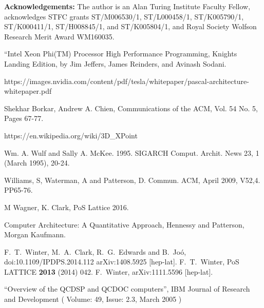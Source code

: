 \documentclass{PoS}
\begin{document}
{\bf Acknowledgements:} The author is an Alan Turing Institute Faculty Fellow, acknowledges 
STFC grants ST/M006530/1, ST/L000458/1, ST/K005790/1, ST/K000411/1, ST/H008845/1, and ST/K005804/1, 
and Royal Society Wolfson Research Merit Award WM160035. 

\begin{thebibliography}{99}

``Intel Xeon Phi(TM) Processor High Performance Programming, Knights Landing Edition, by Jim Jeffers, James Reinders, and Avinash Sodani.

https://images.nvidia.com/content/pdf/tesla/whitepaper/pascal-architecture-whitepaper.pdf

Shekhar Borkar, Andrew A. Chien, 
Communications of the ACM, Vol. 54 No. 5, Pages 67-77.

https://en.wikipedia.org/wiki/3D\_XPoint

Wm. A. Wulf and Sally A. McKee. 1995. 
SIGARCH Comput. Archit. News 23, 1 (March 1995), 20-24. 

Williams, S, Waterman, A and Patterson, D.
Commun. ACM, April 2009, V52,4. PP65-76.

M Wagner, K. Clark, PoS Lattice 2016.

Computer Architecture: A Quantitative Approach, Hennessy and Patterson, Morgan Kaufmann.

 F.~T.~Winter, M.~A.~Clark, R.~G.~Edwards and B.~Joó,
  doi:10.1109/IPDPS.2014.112
  arXiv:1408.5925 [hep-lat].
 F.~T.~Winter,
  PoS LATTICE {\bf 2013} (2014) 042.
 F.~Winter,
  arXiv:1111.5596 [hep-lat].

``Overview of the QCDSP and QCDOC computers'', IBM Journal of Research and Development ( Volume: 49, Issue: 2.3, March 2005 )


\end{thebibliography}
\end{document}

